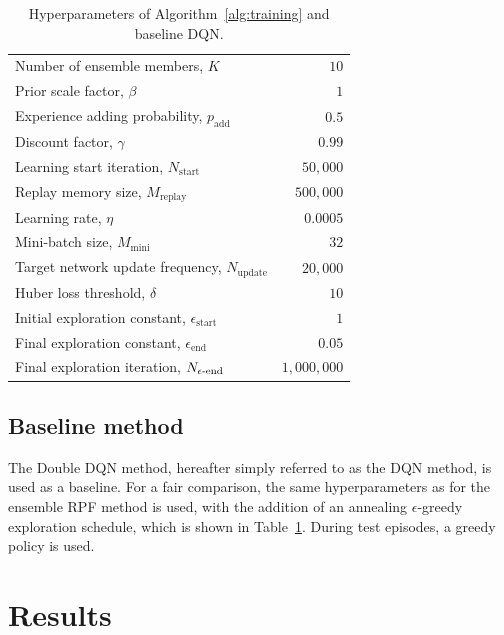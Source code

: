\begin{table}[!bt]
	\renewcommand{\arraystretch}{1.2}
	\caption{Hyperparameters of Algorithm~\ref{alg:training} and baseline DQN.}
	\label{tab:hyperparameters}
	\centering
	\begin{tabular}{lr}
		\toprule
		Number of ensemble members, $K$ & $10$\\
		Prior scale factor, $\beta$ & $1$\\
		Experience adding probability, $p_\mathrm{add}$ & $0.5$\\
		Discount factor, $\gamma$ & $0.99$\\
		Learning start iteration, $N_\mathrm{start}$ & $50{,}000$\\
		Replay memory size, $M_\mathrm{replay}$ & $500{,}000$\\
		Learning rate, $\eta$ & $0.0005$\\
		Mini-batch size, $M_\mathrm{mini}$ & $32$\\
		Target network update frequency, $N_\mathrm{update}$ & $20{,}000$\\
		Huber loss threshold, $\delta$ & $10$\\

		\midrule

		Initial exploration constant, $\epsilon_\mathrm{start}$  & $1$\\
		Final exploration constant, $\epsilon_\mathrm{end}$ & $0.05$\\
		Final exploration iteration, $N_{\epsilon\mathrm{{\text -}end}}$ & $1{,}000{,}000$\\

		\bottomrule
	\end{tabular}
\end{table}


\subsection{Baseline method}
The Double DQN method, hereafter simply referred to as the DQN method, is used as a baseline. For a fair comparison, the same hyperparameters as for the ensemble RPF method is used, with the addition of an annealing $\epsilon$-greedy exploration schedule, which is shown in Table~\ref{tab:hyperparameters}. During test episodes, a greedy policy is used.


\section{Results}
\label{sec:results}

